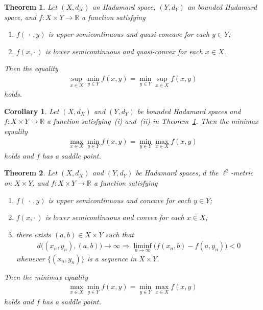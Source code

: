 \documentclass[10pt,a4paper]{amsart}
\newtheorem{theorem}{Theorem}
\newtheorem{corollary}{Corollary}
\def\R{\mathbb R}
\begin{document}
\begin{theorem}\label{thm:Sion-CAT0}
 Let $(X,d_X)$ an Hadamard space, $(Y,d_Y)$ an bounded Hadamard space, and 
 $f\colon X\times Y\to \R$ a function satisfying 
 \begin{enumerate}
  \item[(i)] $f(\,\cdot\,,y)$ is upper semicontinuous 
 and quasi-concave for each $y\in Y$; 
  \item[(ii)] $f(x,\cdot \,)$ is lower semicontinuous 
 and quasi-convex for each $x\in X$. 
 \end{enumerate}
 Then the equality 
 \begin{align}
  \sup_{x\in X}\min_{y\in Y} f(x,y)=\min_{y\in Y} \sup_{x\in X} f(x,y) 
 \end{align}
 holds. 
\end{theorem}

\begin{corollary}\label{cor:Sion-CAT0}
 Let $(X,d_X)$ and $(Y,d_Y)$ be bounded Hadamard spaces and 
 $f\colon X\times Y\to \R$ a function 
 satisfying~(i) and~(ii) in 
 Theorem~\ref{thm:Sion-CAT0}. 
 Then the minimax equality 
 \begin{align}
  \max_{x\in X}\min_{y\in Y} f(x,y)=\min_{y\in Y} \max_{x\in X} f(x,y) 
 \end{align}
 holds and $f$ has a saddle point. 
\end{corollary}

\begin{theorem}\label{thm:minimax-coercive}
 Let $(X,d_X)$ and $(Y,d_Y)$ be Hadamard spaces, 
 $d$ the $\ell^2$-metric on $X\times Y$, 
 and $f\colon X\times Y\to \R$ a function satisfying 
 \begin{enumerate}
  \item[(i)] $f(\,\cdot\,,y)$ is upper semicontinuous 
 and concave for each $y\in Y$; 
  \item[(ii)] $f(x,\cdot \,)$ is lower semicontinuous 
 and convex for each $x\in X$; 
  \item[(iii)] there exists $(a,b)\in X\times Y$ such that 
 \begin{align}
  d\bigl((x_n,y_n), (a,b)\bigr)\to \infty 
  \Rightarrow \liminf_{n\to \infty}\bigl(
  f(x_n, b) - f(a, y_n)\bigr) <0
 \end{align}
 whenever $\{(x_n,y_n)\}$ is a sequence in $X\times Y$. 
 \end{enumerate}
 Then the minimax equality 
 \begin{align}
  \max_{x\in X}\min_{y\in Y} f(x,y)=\min_{y\in Y} \max_{x\in X} f(x,y) 
 \end{align}
 holds and $f$ has a saddle point. 
\end{theorem}
\end{document}
